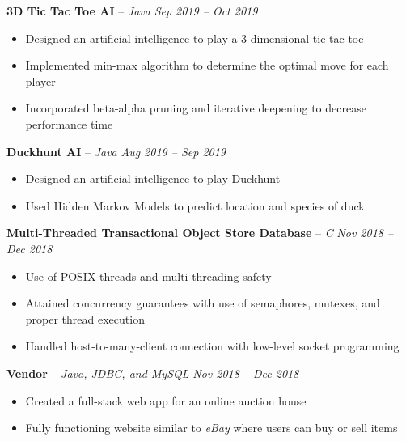 \documentclass[10pt,letterpaper]{article}
\begin{document}
\headedsection 
{\textbf{3D Tic Tac Toe AI} -- \textit{Java}}
{\textit{Sep 2019 -- Oct 2019}} {
	\begin{itemize}[noitemsep,nolistsep]
		\item Designed an artificial intelligence to play a 3-dimensional tic tac toe
		\item Implemented min-max algorithm to determine the optimal move for each player
		\item Incorporated beta-alpha pruning and iterative deepening to decrease performance time
	\end{itemize}
}
				



\headedsection 
{\textbf{Duckhunt AI} -- \textit{Java}}
{\textit{Aug 2019 -- Sep 2019}} {
	\begin{itemize}[noitemsep,nolistsep]
		\item Designed an artificial intelligence to play Duckhunt
		\item Used Hidden Markov Models to predict location and species of duck
	\end{itemize}
}
				


\headedsection 
{\textbf{Multi-Threaded Transactional Object Store Database} -- \textit{C}}
{\textit{Nov 2018 -- Dec 2018}} {
	\begin{itemize}[noitemsep,nolistsep]
		\item Use of POSIX threads and multi-threading safety
		\item Attained concurrency guarantees with use of semaphores, mutexes, and proper thread execution
		\item Handled host-to-many-client connection with low-level socket programming
	\end{itemize}
}
				
										
\headedsection 
{\textbf{Vendor} -- \textit{Java, JDBC, and MySQL}}
{\textit{Nov 2018 -- Dec 2018}} {
	\begin{itemize}[noitemsep,nolistsep]
		\item Created a full-stack web app for an online auction house
		\item Fully functioning website similar to \textit{eBay} where users can buy or sell items
	\end{itemize}
}
\end{document}
